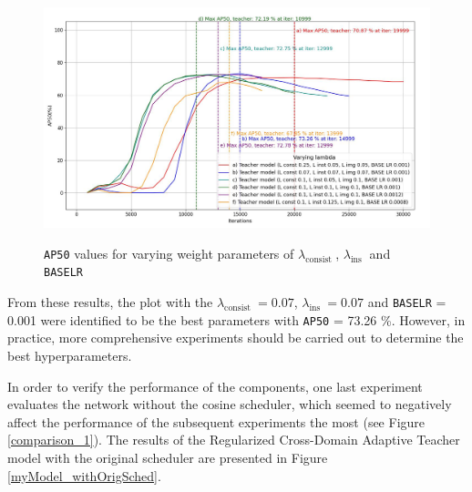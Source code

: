 \begin{figure}[htb]
	\begin{center}
		\includegraphics[width=14cm]{./AP50_varying_lambda.jpg}
	\end{center}
	\caption{\texttt{AP50} values for varying weight parameters of $\lambda_{\text {consist }}$, $\lambda_{\text {ins }}$ and \texttt{BASE\textunderscore LR}}
	\begin{center}
		\label{myModel_varying_params}
	\end{center}
\end{figure}
\FloatBarrier  
From these results, the plot with the $\lambda_{\text {consist }} = 0.07$, $\lambda_{\text {ins }} = 0.07$ and \texttt{BASE\textunderscore LR} = 0.001 were identified to be the best parameters with \texttt{AP50} = 73.26 \%. However, in practice, more comprehensive experiments should be carried out to determine the best hyperparameters. 

In order to verify the performance of the components, one last experiment evaluates the network without the cosine scheduler, which seemed to negatively affect the performance of the subsequent experiments the most (see Figure \ref{comparison_1}). The results of the Regularized Cross-Domain Adaptive Teacher model with the original scheduler are presented in Figure \ref{myModel_withOrigSched}.

